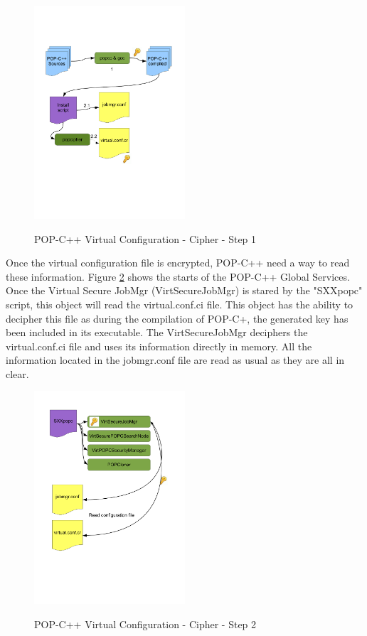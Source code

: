 \begin{figure}[ht]
	\caption{POP-C++ Virtual Configuration - Cipher - Step 1}
  	\centering
	\includegraphics[width=0.5\textwidth]{./pic/cipher1.pdf}
	\label{fig:cipher1}
\end{figure}


Once the virtual configuration file is encrypted, POP-C++ need a way to read these information. Figure \ref{fig:cipher2} shows the starts of the POP-C++ Global Services. Once the Virtual Secure JobMgr (VirtSecureJobMgr) is stared by the "SXXpopc" script, this object will read the virtual.conf.ci file. This object has the ability to decipher this file as during the compilation of POP-C+, the generated key has been included in its executable. The VirtSecureJobMgr deciphers the virtual.conf.ci file and uses its information directly in memory. All the information located in the jobmgr.conf file are read as usual as they are all in clear. \s
\begin{figure}[ht]
	\caption{POP-C++ Virtual Configuration - Cipher - Step 2}
  	\centering
	\includegraphics[width=0.5\textwidth]{./pic/cipher2.pdf}
	\label{fig:cipher2}
\end{figure}


